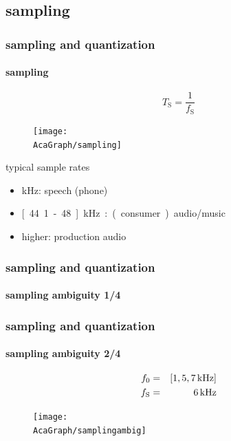 \subsection{sampling}	
\begin{frame}\frametitle{sampling and quantization}\framesubtitle{sampling}
		\vspace{-5mm}
        \begin{equation}\nonumber
			T_{\mathrm{S}} = \frac{1}{f_{\mathrm{S}}} 
		\end{equation}
		\begin{figure}
			\centering
				\texttt{[image: \\AcaGraph/sampling]}
			\label{fig:sampling}
		\end{figure}
		\pause
		typical sample rates
		\begin{itemize}
			\item	\unit[8-16]{kHz}: speech (phone)
			\item	\unit[44.1-48]{kHz}: (consumer) audio/music
			\item	higher: production audio
		\end{itemize}
	\end{frame}	

	\begin{frame}\frametitle{sampling and quantization}\framesubtitle{sampling ambiguity 1/4}
        \begin{center}
        \end{center}
	\end{frame}
	
	\begin{frame}\frametitle{sampling and quantization}\framesubtitle{sampling ambiguity 2/4}
		\begin{eqnarray}
			f_0 &=& [\unit[1, 5, 7]{kHz}]\\
			f_{\mathrm{S}} &=& \unit[6]{kHz}
		\end{eqnarray}
		\begin{figure}
			\centering
				\texttt{[image: \\AcaGraph/samplingambig]}
				\label{fig:samplingambig}
		\end{figure}
	\end{frame}	
	
